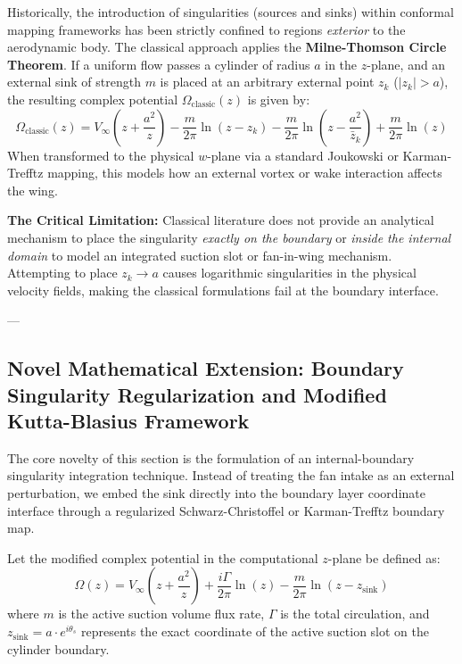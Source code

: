\documentclass[12pt,a4paper]{article}
\begin{document}
\begin{tcolorbox}[colback=blue!5, colframe=blue!65!black, title=\textbf{State of the Art: Classical External Sink Models and Limitations}]
Historically, the introduction of singularities (sources and sinks) within conformal mapping frameworks has been strictly confined to regions \textit{exterior} to the aerodynamic body. The classical approach applies the \textbf{Milne-Thomson Circle Theorem}. If a uniform flow passes a cylinder of radius $a$ in the $z$-plane, and an external sink of strength $m$ is placed at an arbitrary external point $z_k$ ($|z_k| > a$), the resulting complex potential $\Omega_{\text{classic}}(z)$ is given by:
\begin{equation}
    \Omega_{\text{classic}}(z) = V_\infty \left( z + \frac{a^2}{z} \right) - \frac{m}{2\pi} \ln(z - z_k) - \frac{m}{2\pi} \ln\left( z - \frac{a^2}{\bar{z}_k} \right) + \frac{m}{2\pi}\ln(z)
\end{equation}
When transformed to the physical $w$-plane via a standard Joukowski or Karman-Trefftz mapping, this models how an external vortex or wake interaction affects the wing. 

\textbf{The Critical Limitation:} Classical literature does not provide an analytical mechanism to place the singularity \textit{exactly on the boundary} or \textit{inside the internal domain} to model an integrated suction slot or fan-in-wing mechanism. Attempting to place $z_k \to a$ causes logarithmic singularities in the physical velocity fields, making the classical formulations fail at the boundary interface.
\end{tcolorbox}

---

\subsection{Novel Mathematical Extension: Boundary Singularity Regularization and Modified Kutta-Blasius Framework}

The core novelty of this section is the formulation of an internal-boundary singularity integration technique. Instead of treating the fan intake as an external perturbation, we embed the sink directly into the boundary layer coordinate interface through a regularized Schwarz-Christoffel or Karman-Trefftz boundary map. 

Let the modified complex potential in the computational $z$-plane be defined as:
\begin{equation}
    \Omega(z) = V_\infty \left( z + \frac{a^2}{z} \right) + \frac{i\Gamma}{2\pi}\ln(z) - \frac{m}{2\pi}\ln(z - z_{\text{sink}})
\end{equation}
where $m$ is the active suction volume flux rate, $\Gamma$ is the total circulation, and $z_{\text{sink}} = a \cdot e^{i\theta_s}$ represents the exact coordinate of the active suction slot on the cylinder boundary.
\end{document}

